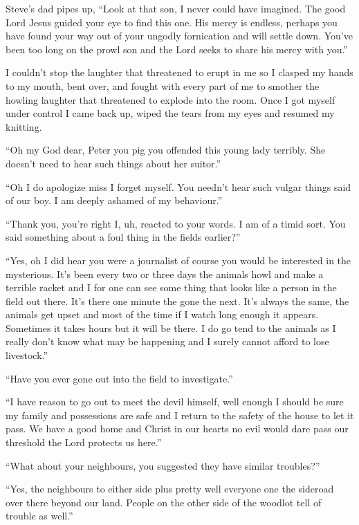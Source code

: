 Steve's dad pipes up, ``Look at that son, I never could have imagined. The good Lord Jesus guided your eye to find this one. His mercy is endless, perhaps you have found your way out of your ungodly fornication and will settle down. You've been too long on the prowl son and the Lord seeks to share his mercy with you.''

I couldn't stop the laughter that threatened to erupt in me so I clasped my hands to my mouth, bent over, and fought with every part of me to smother the howling laughter that threatened to explode into the room. Once I got myself under control I came back up, wiped the tears from my eyes and resumed my knitting.

``Oh my God dear, Peter you pig you offended this young lady terribly. She doesn't need to hear such things about her suitor.''

``Oh I do apologize miss I forget myself. You needn't hear such vulgar things said of our boy. I am deeply ashamed of my behaviour.''

``Thank you, you're right I, uh, reacted to your words. I am of a timid sort. You said something about a foul thing in the fields earlier?''

``Yes, oh I did hear you were a journalist of course you would be interested in the mysterious. It's been every two or three days the animals howl and make a terrible racket and I for one can see some thing that looks like a person in the field out there. It's there one minute the gone the next. It's always the same, the animals get upset and most of the time if I watch long enough it appears. Sometimes it takes hours but it will be there. I do go tend to the animals as I really don't know what may be happening and I surely cannot afford to lose livestock.''

``Have you ever gone out into the field to investigate.''

``I have reason to go out to meet the devil himself, well enough I should be sure my family and possessions are safe and I return to the safety of the house to let it pass. We have a good home and Christ in our hearts no evil would dare pass our threshold the Lord protects us here.''

``What about your neighbours, you suggested they have similar troubles?''

``Yes, the neighbours to either side plus pretty well everyone one the sideroad over there beyond our land. People on the other side of the woodlot tell of trouble as well.''

